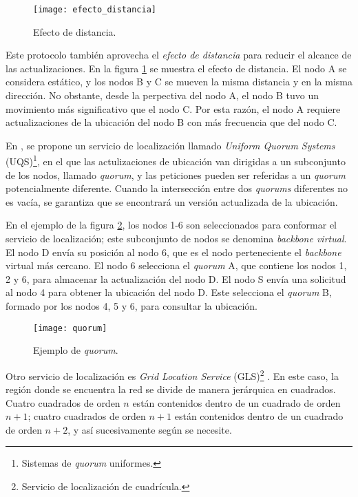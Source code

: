 \begin{figure}[th]
\centering
\texttt{[image: efecto\_distancia]}
\decoRule
\caption[Efecto de distancia]{Efecto de distancia\protect\footnotemark.}
\label{fig:efecto_distancia}
\end{figure}


Este protocolo también aprovecha el \textit{efecto de distancia} para reducir el
alcance de las actualizaciones. En la figura \ref{fig:efecto_distancia} se
muestra el efecto de distancia. El nodo A se considera estático, y los nodos B
y C se mueven la misma distancia y en la misma dirección. No obstante, desde la
perpectiva del nodo A, el nodo B tuvo un movimiento más significativo que el
nodo C. Por esta razón, el nodo A requiere actualizaciones de la ubicación del
nodo B con más frecuencia que del nodo C.

En \cite{Haas1999}, se propone un servicio de localización llamado
\textit{Uniform Quorum Systems} (UQS)\footnote{Sistemas de \textit{quorum}
uniformes.}, en el que las actulizaciones de ubicación van dirigidas a un
subconjunto de los nodos, llamado \textit{quorum}, y las peticiones pueden
ser referidas a un \textit{quorum} potencialmente diferente. Cuando la
intersección entre dos \textit{quorums} diferentes no es vacía, se garantiza
que se encontrará un versión actualizada de la ubicación.

En el ejemplo de la figura \ref{fig:quorum}, los nodos 1-6 son seleccionados
para conformar el servicio de localización; este subconjunto de nodos se
denomina \textit{backbone virtual}. El nodo D envía su posición al nodo 6,
que es el nodo perteneciente el \textit{backbone} virtual más cercano. El nodo
6 selecciona el \textit{quorum} A, que contiene los nodos 1, 2 y 6, para
almacenar la actualización del nodo D. El nodo S envía una solicitud al nodo 4
para obtener la ubicación del nodo D. Este selecciona el \textit{quorum} B,
formado por los nodos 4, 5 y 6, para consultar la ubicación.

\begin{figure}[th]
\centering
\texttt{[image: quorum]}
\decoRule
\caption[Ejemplo de \textit{quorum}]{Ejemplo de \textit{quorum}\protect\footnotemark.}
\label{fig:quorum}
\end{figure}


Otro servicio de localización es \textit{Grid Location Service}
(GLS)\footnote{Servicio de localización de cuadrícula.} \cite{Li2000}. En este
caso, la región donde se encuentra la red se divide de manera jerárquica en
cuadrados. Cuatro cuadrados de orden $n$ están contenidos dentro de un cuadrado
de orden $n+1$; cuatro cuadrados de orden $n+1$ están contenidos dentro de un
cuadrado de orden $n+2$, y así sucesivamente según se necesite.

